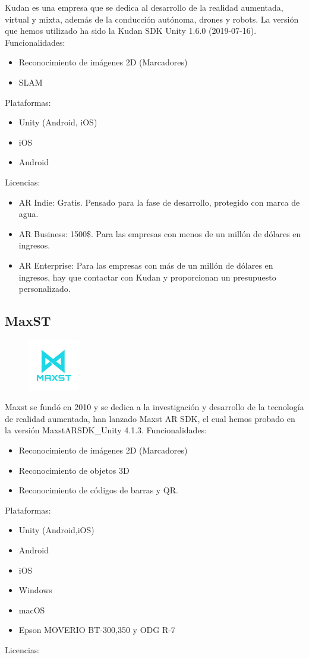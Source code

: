 Kudan es una empresa que se dedica al desarrollo de la realidad aumentada, virtual y mixta, además de la conducción autónoma, drones y robots. La versión que hemos utilizado ha sido la Kudan SDK Unity 1.6.0 (2019-07-16).\cite{Kudan}
Funcionalidades:
\begin{itemize}
\item Reconocimiento de imágenes 2D (Marcadores)
\item SLAM
\end{itemize}
Plataformas:
\begin{itemize}
\item Unity (Android, iOS)
\item iOS
\item Android
\end{itemize}
Licencias:
\begin{itemize}
\item AR Indie: Gratis. Pensado para la fase de desarrollo, protegido con marca de agua.
\item AR Business: 1500\$. Para las empresas con menos de un millón de dólares en ingresos.
\item AR Enterprise: Para las empresas con más de un millón de dólares en ingresos, hay que contactar con Kudan y proporcionan un presupuesto personalizado.
\end{itemize}

\clearpage
\subsection{MaxST}

 \begin{figure}[H]
    \centering
    \includegraphics[width=0.2\textwidth]{Images/Maxst_Logo.jpeg}
    \label{fig:Maxst}
\end{figure}

Maxst se fundó en 2010 y se dedica a la investigación y desarrollo de la tecnología de realidad aumentada, han lanzado Maxst AR SDK, el cual hemos probado en la versión MaxstARSDK\_Unity 4.1.3. \cite{Maxst}
Funcionalidades:
\begin{itemize}
\item Reconocimiento de imágenes 2D (Marcadores)
\item Reconocimiento de objetos 3D
\item Reconocimiento de códigos de barras y QR.
\end{itemize}
Plataformas:
\begin{itemize}
\item Unity (Android,iOS)
\item Android
\item iOS
\item Windows
\item macOS
\item Epson MOVERIO BT-300,350 y ODG R-7
\end{itemize}
Licencias:

